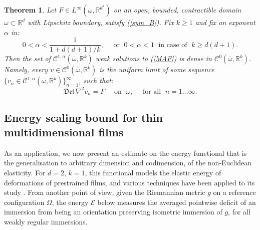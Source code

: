 \documentclass[reqno,twoside,11pt]{amsart}
\newcommand{\R}{\mathbb{R}}
\numberwithin{equation}{section}
\theoremstyle{plain}
\newtheorem{theorem}{Theorem}[section]
\theoremstyle{definition}
\begin{document}
\begin{theorem}\label{th_CI_weakMA} 
Let $F\in L^{\infty} (\omega, \R^{d^4})$ on an open, bounded, contractible
domain $\omega\subset\mathbb{R}^d$ with Lipschitz boundary, satisfy
(\ref{sym_B}).  Fix $k\geq 1$ and fix an exponent $\alpha$ in:
$$0< \alpha< \frac{1}{1+d(d+1)/k}, \quad \mbox{ or } \; 0< \alpha< 1
\; \mbox{ in case of } \; k\geq d(d+1).$$ 
Then the set of $\mathcal{\mathcal{C}}^{1,\alpha}(\bar\omega, \R^k)$
weak solutions to (\ref{MAF}) is dense in $\mathcal{\mathcal{C}}^0(\bar\omega, \R^k)$. 
Namely, every $v\in \mathcal{\mathcal{C}}^0(\bar\omega,\R^k)$ is the
uniform limit of some sequence $\{v_n\in\mathcal{\mathcal{C}}^{1,\alpha}(\bar\omega,\R^k)\}_{n=1}^\infty$,
such that:
\begin{equation*} 
\mathfrak{Det}\, \nabla^2 v_n  = F \quad \mbox{ on } \; \omega,
\quad\mbox{ for all }\; n=1\ldots\infty.
\end{equation*}
\end{theorem} 

\subsection{Energy scaling bound for thin multidimensional films}

As an application, we now present an estimate on the energy
functional that is the generalisation to arbitrary dimension and
codimension, of the non-Euclidean
elasticity. For $d=2$, $k=1$, this functional models the
elastic energy of deformations of prestrained films, and various
techniques have been applied to its study \cite{lew_book}. From
another point of view, given the Riemannian metric $g$ on a reference
configuration $\Omega$, the energy 
$\mathcal{E}$ below measures the averaged pointwise deficit of an
immersion from being an orientation preserving isometric immersion of
$g$, for all weakly regular immersions.

\medskip
\end{document}
